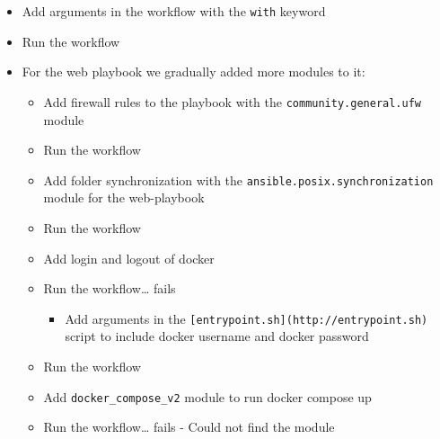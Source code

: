 \begin{itemize}
\begin{Shaded}
\begin{Highlighting}[]
    \KeywordTok{:}
    \AttributeTok{  }\KeywordTok{:}\AttributeTok{ }
    \AttributeTok{  }\KeywordTok{:}\AttributeTok{ }
    \AttributeTok{  }\KeywordTok{:}
    \AttributeTok{    }\KeywordTok{{-}}
    \AttributeTok{    }\KeywordTok{{-}}
    \AttributeTok{    }\KeywordTok{{-}}
    \AttributeTok{    }\KeywordTok{{-}}
    \AttributeTok{    }\KeywordTok{{-}}
    \AttributeTok{    }\KeywordTok{{-}}
    \AttributeTok{    }\KeywordTok{{-}}
    \AttributeTok{    }\KeywordTok{{-}}
    \end{Highlighting}
    \end{Shaded}

    \item Add arguments in the workflow with the \texttt{with} keyword
    \item Run the workflow
    \item For the web playbook we gradually added more modules to it:

    \begin{itemize}
        \item Add firewall rules to the playbook with the \texttt{community.general.ufw} module
        \item Run the workflow
        \item Add folder synchronization with the \texttt{ansible.posix.synchronization} module for the web-playbook
        \item Run the workflow
        \item Add login and logout of docker
        \item Run the workflow\ldots{} fails

        \begin{itemize}
            \item Add arguments in the \texttt{{[}entrypoint.sh{]}(http://entrypoint.sh)} script to include docker username and docker password
        \end{itemize}

        \item Run the workflow
        \item Add \texttt{docker\_compose\_v2} module to run docker compose up
        \item Run the workflow\ldots{} fails - Could not find the module


\end{itemize}
\end{itemize}
